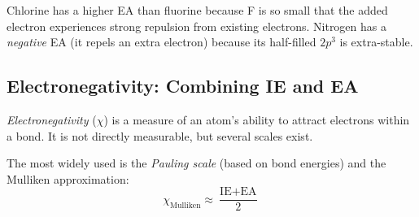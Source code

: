 \documentclass[12pt, a4paper]{book}
\newcommand{\newterm}[1]{\textit{\textcolor{DiscoveryColor}{#1}}}
\begin{document}
Chlorine has a higher EA than fluorine because F is so
small that the added electron experiences strong
repulsion from existing electrons.
Nitrogen has a \emph{negative} EA (it repels an extra electron)
because its half-filled $2p^3$ is extra-stable.

\subsection{Electronegativity: Combining IE and EA}

\newterm{Electronegativity} ($\chi$) is a measure of
an atom's ability to attract electrons within a bond.
It is not directly measurable, but several scales exist.

The most widely used is the \newterm{Pauling scale}
(based on bond energies) and the Mulliken approximation:
\[
  \chi_\text{Mulliken} \approx \frac{\text{IE} + \text{EA}}{2}
\]
\end{document}
